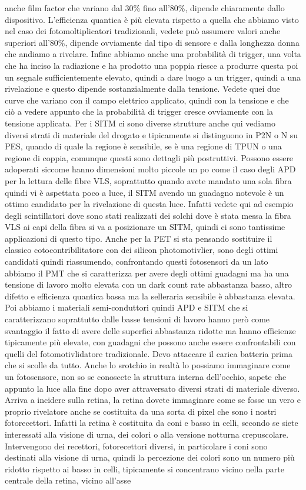 {anche film factor che variano dal 30\% fino all'80\%, dipende chiaramente dallo dispositivo. L'efficienza quantica è più elevata rispetto a quella che abbiamo visto nel caso dei fotomoltiplicatori tradizionali, vedete può assumere valori anche superiori all'80\%, dipende ovviamente dal tipo di sensore e dalla longhezza donna che andiamo a rivelare. Infine abbiamo anche una probabilità di trigger, una volta che ha inciso la radiazione e ha prodotto una poppia riesce a produrre questa poi un segnale sufficientemente elevato, quindi a dare luogo a un trigger, quindi a una rivelazione e questo dipende sostanzialmente dalla tensione. Vedete quei due curve che variano con il campo elettrico applicato, quindi con la tensione e che ciò a vedere appunto che la probabilità di trigger cresce ovviamente con la tensione applicata. Per i SITM ci sono diverse strutture anche qui vediamo diversi strati di materiale del drogato e tipicamente si distinguono in P2N o N su PES, quando di quale la regione è sensibile, se è una regione di TPUN o una regione di coppia, comunque questi sono dettagli più postruttivi. Possono essere adoperati siccome hanno dimensioni molto piccole un po come il caso degli APD per la lettura delle fibre VLS, soprattutto quando avete mandato una sola fibra quindi vi è aspettata poco a luce, il SITM avendo un guadagno notevole è un ottimo candidato per la rivelazione di questa luce. Infatti vedete qui ad esempio degli scintillatori dove sono stati realizzati dei solchi dove è stata messa la fibra VLS ai capi della fibra si va a posizionare un SITM, quindi ci sono tantissime applicazioni di questo tipo. Anche per la PET si sta pensando sostituire il classico cotocontribilitatore con dei silicon photomotivlier, sono degli ottimi candidati quindi riassumendo, confrontando questi fotosensori da un lato abbiamo il PMT che si caratterizza per avere degli ottimi guadagni ma ha una tensione di lavoro molto elevata con un dark count rate abbastanza basso, altro difetto e efficienza quantica bassa ma la selleraria sensibile è abbastanza elevata. Poi abbiamo i materiali semi-conduttori quindi APD e SITM che si caratterizzano soprattutto dalle basse tensioni di lavoro hanno però come svantaggio il fatto di avere delle superfici abbastanza ridotte ma hanno efficienze tipicamente più elevate, con guadagni che possono anche essere confrontabili con quelli del fotomotivlidatore tradizionale. Devo attaccare il carica batteria prima che si scolle da tutto. Anche lo srotchio in realtà lo possiamo immaginare come un fotosensore, non so se conoscete la struttura interna dell'occhio, sapete che appunto la luce alla fine dopo aver attraversato diversi strati di materiale diverso. Arriva a incidere sulla retina, la retina dovete immaginare come se fosse un vero e proprio rivelatore anche se costituita da una sorta di pixel che sono i nostri fotorecettori. Infatti la retina è costituita da coni e basso in celli, secondo se siete interessati alla visione di urna, dei colori o alla versione notturna crepuscolare. Intervengono dei recettori, fotorecettori diversi, in particolare i coni sono destinati alla visione di urna, quindi la percezione dei colori sono un numero più ridotto rispetto ai basso in celli, tipicamente si concentrano vicino nella parte centrale della retina, vicino all'asse }
